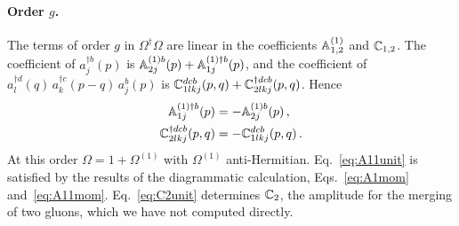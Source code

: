 \paragraph{Order $g$.} The terms of order $g$ in $\Omega^\dagger\Omega$ are linear in the coefficients $\mathbb{A}^{(1)}_{1,2}$ and $\mathbb{C}_{1,2}$. The coefficient of $a^{\dagger b}_j(p)$ is $\mathbb{A}^{(1)b}_{2j}(p)+\mathbb{A}^{(1)\dagger b}_{1j}(p)$, and the coefficient of $a^{\dagger d}_l(q)\,a^{\dagger c}_k(p-q)\,a^b_j(p)$ is $\mathbb{C}^{dcb}_{1lkj}(p,q)+\mathbb{C}^{\dagger dcb}_{2lkj}(p,q)$. Hence
\begin{align}
\mathbb{A}^{(1)\dagger b}_{1j}(p)&=-\mathbb{A}^{(1)b}_{2j}(p)\,,\label{eq:A11unit}\\
\mathbb{C}^{\dagger dcb}_{2lkj}(p,q)&=-\mathbb{C}^{dcb}_{1lkj}(p,q)\,.\label{eq:C2unit}
\end{align}
At this order $\Omega=1+\Omega^{(1)}$ with $\Omega^{(1)}$ anti-Hermitian. Eq.~\eqref{eq:A11unit} is satisfied by the results of the diagrammatic calculation, Eqs.~\eqref{eq:A1mom} and~\eqref{eq:A11mom}. Eq.~\eqref{eq:C2unit} determines $\mathbb{C}_2$, the amplitude for the merging of two gluons, which we have not computed directly.

